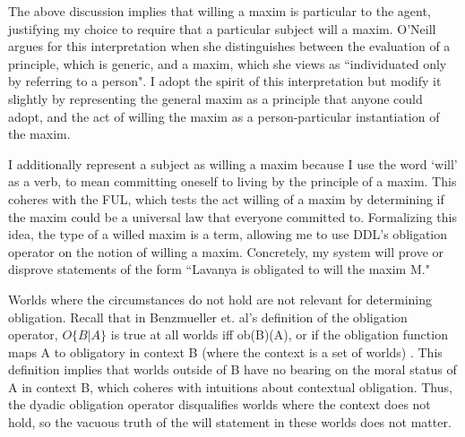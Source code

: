 \begin{isabellebody}
\begin{isamarkuptext}
The above discussion implies that willing a maxim is particular to the agent, justifying my choice to 
require that a particular subject will a maxim. O'Neill argues for this interpretation when she distinguishes 
between the evaluation of a principle, which is generic, and a maxim, which she views as ``individuated only 
by referring to a person"\cite[13]{actingonprinciple}. I adopt the spirit of this interpretation but modify it slightly 
by representing the general maxim as a principle that anyone could adopt, and the act of willing the maxim 
as a person-particular instantiation of the maxim.

I additionally represent a subject as willing a maxim because I use the word `will' as a verb, to mean committing oneself to living by
the principle of a maxim. This coheres with the FUL, which tests the act willing 
of a maxim by determining if the maxim could be a universal law that everyone committed to. Formalizing this idea,
the type of a willed maxim is a term, allowing me
to use DDL's obligation operator on the notion of willing a maxim. Concretely, my system will prove 
or disprove statements of the form ``Lavanya is obligated to will the maxim M." 

Worlds where the circumstances do not hold are not relevant for determining obligation. Recall that in 
Benzmueller et. al's definition of the obligation operator,  $O \{B|A\}$ is true at all worlds iff ob(B)(A), or 
if the obligation function maps A to obligatory in context B (where the context is a set of worlds) \cite{BFP}. This 
definition implies that worlds outside of B have no bearing on the moral status of A in context B, which 
coheres with intuitions about contextual obligation. Thus, the dyadic obligation operator 
disqualifies worlds where the context does not hold, so the vacuous truth of the will statement in 
these worlds does not matter. 


\end{isamarkuptext}
\end{isabellebody}
